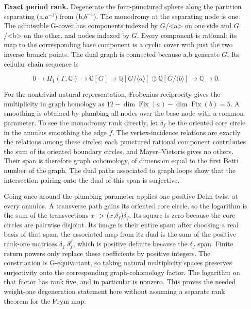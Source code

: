 \textbf{Exact period rank.} Degenerate the four-punctured sphere along the partition separating (a,\(a^{-1}\)) from (b,\(b^{-1}\)). The monodromy at the separating node is one. The admissible G-cover has components indexed by \(G\)/\textless{}a\textgreater{} on one side and \(G\)/\textless{}b\textgreater{} on the other, and nodes indexed by \(G\). Every component is rational: its map to the corresponding base component is a cyclic cover with just the two inverse branch points. The dual graph is connected because a,b generate \(G\). Its cellular chain sequence is

\[
0\longrightarrow H_1(\Gamma,\mathbb Q)\longrightarrow\mathbb Q[G]\longrightarrow\mathbb Q[G/\langle a\rangle]\oplus\mathbb Q[G/\langle b\rangle]\longrightarrow\mathbb Q\longrightarrow0.
\]

For the nontrivial natural representation, Frobenius reciprocity gives the multiplicity in graph homology as \(12-\dim\operatorname{Fix}(a)-\dim\operatorname{Fix}(b)=5\). A smoothing is obtained by plumbing all nodes over the base node with a common parameter. To see the monodromy rank directly, let \(\delta_f\) be the oriented core circle in the annulus smoothing the edge \(f\). The vertex-incidence relations are exactly the relations among these circles: each punctured rational component contributes the sum of its oriented boundary circles, and Mayer--Vietoris gives no others. Their span is therefore graph cohomology, of dimension equal to the first Betti number of the graph. The dual paths associated to graph loops show that the intersection pairing onto the dual of this span is surjective.

Going once around the plumbing parameter applies one positive Dehn twist at every annulus. A transverse path gains its oriented core circle, so the logarithm is the sum of the transvections \(x\) -\textgreater{} (\(x\),\(\delta_f\))\(\delta_f\). Its square is zero because the core circles are pairwise disjoint. Its image is their entire span: after choosing a real basis of that span, the associated map from its dual is the sum of the positive rank-one matrices \(\delta_f\) \(\delta_f^t\), which is positive definite because the \(\delta_f\) span. Finite return powers only replace these coefficients by positive integers. The construction is G-equivariant, so taking natural multiplicity spaces preserves surjectivity onto the corresponding graph-cohomology factor. The logarithm on that factor has rank five, and in particular is nonzero. This proves the needed weight-one degeneration statement here without assuming a separate rank theorem for the Prym map.

